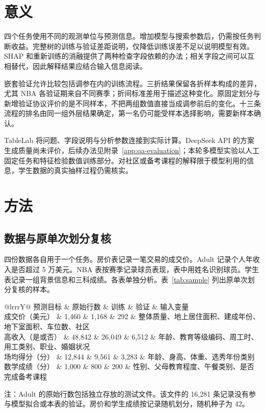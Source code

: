 \documentclass[12pt,journal,onecolumn,a4paper]{IEEEtran}
\newcommand{\tabnote}[1]{\par\vspace{2pt}\begin{minipage}{\linewidth}\footnotesize #1\end{minipage}}
\newcommand{\inlinetab}[1]{\begin{table}[H]\centering\small #1\end{table}}
\begin{document}
\section{意义}
四个任务使用不同的观测单位与预测信息。增加模型与搜索参数后，仍需按任务判断收益。完整树的训练与验证差距说明，仅降低训练误差不足以说明模型有效。SHAP 和重新训练的消融提供了两种检查字段依赖的办法；相关字段之间可以互相替代，因此解释结果应结合输入信息阅读。

嵌套验证允许比较包括调参在内的训练流程。三折结果保留各折样本构成的差异，尤其 NBA 各验证期来自不同赛季；折间标准差用于描述这种变化。原固定划分与新增验证协议评价的是不同样本，不把两组数值直接当成调参前后的变化。十三条流程的排名由同一组外层结果确定，第一名仍可能受样本选择影响，需要新样本确认。

TableLab 将问题、字段说明与分析参数连接到实际计算。DeepSeek API 的方案生成质量尚未评价，后续办法见附录~\ref{app:qa-evaluation}；本轮多模型实验以人工固定任务和特征检验数值训练部分。对社区或备考课程的解释限于模型利用的信息，学生数据的真实抽样过程仍需核实。

\section{方法}
\subsection{数据与原单次划分复核}
四份数据各自用于一个任务。房价表记录一笔交易的成交价。Adult 记录个人年收入是否超过 5 万美元。NBA 表按赛季记录球员表现，表中用姓名识别球员。学生表记录一组背景信息和三科成绩。各表单独分析。表~\ref{tab:sample} 列出原单次划分复核的样本。
\inlinetab{\label{tab:sample}
\begin{tabularx}{\linewidth}{@{}lrrrY@{}}\toprule
预测目标 & 原始行数 & 训练 & 验证 & 输入变量\\\midrule
成交价（美元） & 1,460 & 1,168 & 292 & 整体质量、地上居住面积、建成年份、地下室面积、车位数、社区\\
高收入（是或否） & 48,842 & 26,049 & 6,512 & 年龄、教育等级编码、周工时、用工类别、职业、婚姻状况\\
场均得分（分） & 12,844 & 9,561 & 3,283 & 年龄、身高、体重、选秀年份类别\\
数学成绩（分） & 1,000 & 800 & 200 & 性别、父母教育程度、午餐类别、是否完成备考课程\\\bottomrule
\end{tabularx}
\tabnote{注：Adult 的原始行数包括独立存放的测试文件。该文件的 16,281 条记录没有参与模型拟合或本表的验证。房价和学生成绩按记录随机划分，随机种子为 42。}}
\end{document}
